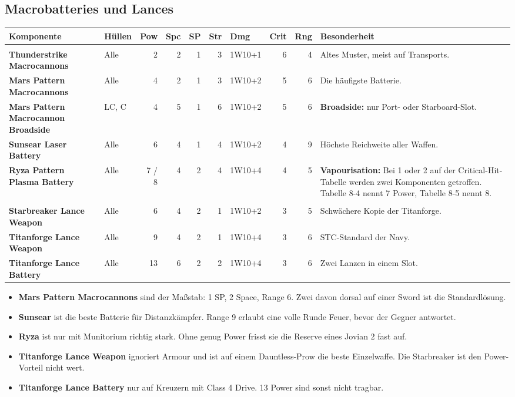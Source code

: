 \documentclass[9pt,a4paper]{extarticle}
\newcommand{\nm}[1]{\textbf{#1}}
\newcommand{\eff}[1]{\textbf{#1:}}
\newenvironment{urteil}{\begin{tcolorbox}[colback=brasssoft,colframe=brass,boxrule=0pt,leftrule=2pt,arc=0pt,left=6pt,right=6pt,top=4pt,bottom=4pt,before skip=6pt,after skip=10pt,title={\monofont\scriptsize\bfseries\color{brass}URTEIL},coltitle=brass,colbacktitle=brasssoft,toptitle=2pt,bottomtitle=0pt,attach title to upper=\par]\begin{itemize}[leftmargin=10pt,itemsep=1pt,parsep=0pt,topsep=2pt]}{\end{itemize}\end{tcolorbox}}
\begin{document}
\subsection{Macrobatteries und Lances}
\begin{xltabular}{\linewidth}{l H N N N N P N N Y}
\toprule
{}\textbf{Komponente} & \textbf{Hüllen} & \textbf{Pow} & \textbf{Spc} & \textbf{SP} & \textbf{Str} & \textbf{Dmg} & \textbf{Crit} & \textbf{Rng} & \textbf{Besonderheit}\\
\midrule
\endhead
{}\\
\nm{Thunderstrike Macrocannons} & Alle & 2 & 2 & 1 & 3 & 1W10+1 & 6 & 4 & Altes Muster, meist auf Transports.\\
\nm{Mars Pattern Macrocannons} & Alle & 4 & 2 & 1 & 3 & 1W10+2 & 5 & 6 & Die häufigste Batterie.\\
\nm{Mars Pattern Macrocannon Broadside} & LC, C & 4 & 5 & 1 & 6 & 1W10+2 & 5 & 6 & \eff{Broadside} nur Port- oder Starboard-Slot.\\
\nm{Sunsear Laser Battery} & Alle & 6 & 4 & 1 & 4 & 1W10+2 & 4 & 9 & Höchste Reichweite aller Waffen.\\
\nm{Ryza Pattern Plasma Battery} & Alle & 7 / 8 & 4 & 2 & 4 & 1W10+4 & 4 & 5 & \eff{Vapourisation} Bei 1 oder 2 auf der Critical-Hit-Tabelle werden zwei Komponenten getroffen. Tabelle 8-4 nennt 7 Power, Tabelle 8-5 nennt 8.\\
\\
\nm{Starbreaker Lance Weapon} & Alle & 6 & 4 & 2 & 1 & 1W10+2 & 3 & 5 & Schwächere Kopie der Titanforge.\\
\nm{Titanforge Lance Weapon} & Alle & 9 & 4 & 2 & 1 & 1W10+4 & 3 & 6 & STC-Standard der Navy.\\
\nm{Titanforge Lance Battery} & Alle & 13 & 6 & 2 & 2 & 1W10+4 & 3 & 6 & Zwei Lanzen in einem Slot.\\
\bottomrule
\end{xltabular}

\begin{urteil}
\item \nm{Mars Pattern Macrocannons} sind der Maßstab: 1 SP, 2 Space, Range 6. Zwei davon dorsal auf einer Sword ist die Standardlösung.
\item \nm{Sunsear} ist die beste Batterie für Distanzkämpfer. Range 9 erlaubt eine volle Runde Feuer, bevor der Gegner antwortet.
\item \nm{Ryza} ist nur mit Munitorium richtig stark. Ohne genug Power frisst sie die Reserve eines Jovian 2 fast auf.
\item \nm{Titanforge Lance Weapon} ignoriert Armour und ist auf einem Dauntless-Prow die beste Einzelwaffe. Die Starbreaker ist den Power-Vorteil nicht wert.
\item \nm{Titanforge Lance Battery} nur auf Kreuzern mit Class 4 Drive. 13 Power sind sonst nicht tragbar.
\end{urteil}
\end{document}
